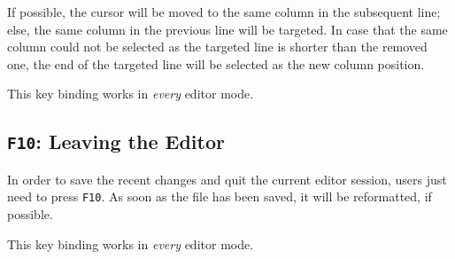\documentclass[11pt, a4paper, british]{scrartcl}
\begin{document}
If possible, the cursor will be moved to the same column in the subsequent line;
else, the same column in the previous line will be targeted.  In case that the
same column could not be selected as the targeted line is shorter than the
removed one, the end of the targeted line will be selected as the new column
position.

This key binding works in \emph{every} editor mode.

\subsection{\texttt{F10}:  Leaving the Editor}
\label{sec:f10-leaving-the-editor}
In order to save the recent changes and quit the current editor session, users
just need to press \texttt{F10}.  As soon as the file has been saved, it will be
reformatted, if possible.

This key binding works in \emph{every} editor mode.

\end{document}
